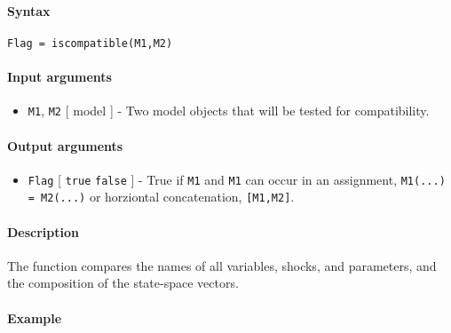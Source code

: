 


	\paragraph{Syntax}

\begin{verbatim}
Flag = iscompatible(M1,M2)
\end{verbatim}

\paragraph{Input arguments}

\begin{itemize}
\itemsep1pt\parskip0pt
\item
  \texttt{M1}, \texttt{M2} {[} model {]} - Two model objects that will
  be tested for compatibility.
\end{itemize}

\paragraph{Output arguments}

\begin{itemize}
\itemsep1pt\parskip0pt
\item
  \texttt{Flag} {[} \texttt{true} \textbar{} \texttt{false} {]} - True
  if \texttt{M1} and \texttt{M1} can occur in an assignment,
  \texttt{M1(...) = M2(...)} or horziontal concatenation,
  \texttt{{[}M1,M2{]}}.
\end{itemize}

\paragraph{Description}

The function compares the names of all variables, shocks, and
parameters, and the composition of the state-space vectors.

\paragraph{Example}


